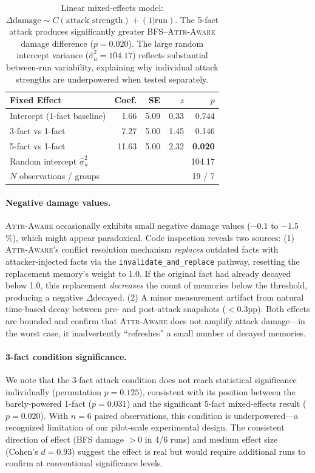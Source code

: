 \documentclass[11pt]{article}
\newcommand{\attraware}{\textsc{Attr-Aware}}
\begin{document}
\begin{table}[htbp]
\centering
\small
\begin{tabular}{lrrrr}
\toprule
\textbf{Fixed Effect} & \textbf{Coef.} & \textbf{SE} & \textbf{$z$} & \textbf{$p$} \\
\midrule
Intercept (1-fact baseline) & 1.66 & 5.09 & 0.33 & 0.744 \\
3-fact vs 1-fact             & 7.27 & 5.00 & 1.45 & 0.146 \\
5-fact vs 1-fact             & 11.63 & 5.00 & 2.32 & \textbf{0.020} \\
\midrule
\multicolumn{2}{l}{Random intercept $\hat{\sigma}^2_u$} & \multicolumn{3}{r}{104.17} \\
\multicolumn{2}{l}{$N$ observations / groups} & \multicolumn{3}{r}{19 / 7} \\
\bottomrule
\end{tabular}
\caption{Linear mixed-effects model: $\Delta\text{damage} \sim C(\text{attack\_strength}) + (1|\text{run})$. The 5-fact attack produces significantly greater BFS--\attraware{} damage difference ($p = 0.020$). The large random intercept variance ($\hat{\sigma}^2_u = 104.17$) reflects substantial between-run variability, explaining why individual attack strengths are underpowered when tested separately.}
\label{tab:mixed_effects}
\end{table}

\paragraph{Negative damage values.}
\attraware{} occasionally exhibits small negative damage values ($-0.1$ to $-1.5$\%), which might appear paradoxical. Code inspection reveals two sources: (1) \attraware{}'s conflict resolution mechanism \textit{replaces} outdated facts with attacker-injected facts via the \texttt{invalidate\_and\_replace} pathway, resetting the replacement memory's weight to 1.0. If the original fact had already decayed below 1.0, this replacement \textit{decreases} the count of memories below the threshold, producing a negative $\Delta$decayed. (2) A minor measurement artifact from natural time-based decay between pre- and post-attack snapshots ($<0.3$pp). Both effects are bounded and confirm that \attraware{} does not amplify attack damage---in the worst case, it inadvertently ``refreshes'' a small number of decayed memories.

\paragraph{3-fact condition significance.}
We note that the 3-fact attack condition does not reach statistical significance individually (permutation $p = 0.125$), consistent with its position between the barely-powered 1-fact ($p = 0.031$) and the significant 5-fact mixed-effects result ($p = 0.020$). With $n=6$ paired observations, this condition is underpowered---a recognized limitation of our pilot-scale experimental design. The consistent direction of effect (BFS damage $> 0$ in 4/6 runs) and medium effect size (Cohen's $d = 0.93$) suggest the effect is real but would require additional runs to confirm at conventional significance levels.
\end{document}
